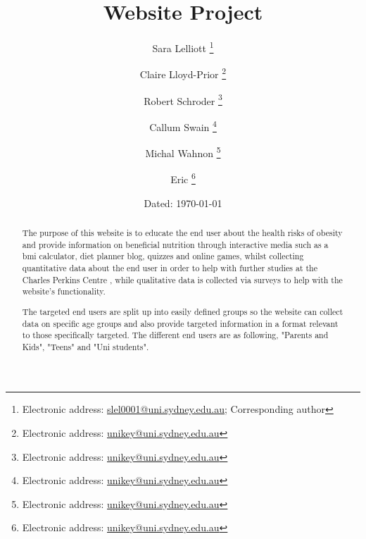 \documentclass[letterpaper,twoside,12pt]{article}
\begin{document}

\author{Sara Lelliott%
  \thanks{Electronic address: \href{mailto:slel0001@uni.sydney.edu.au}{slel0001@uni.sydney.edu.au}; Corresponding author}}
\author{Claire Lloyd-Prior%
  \thanks{Electronic address: \href{mailto:unikey@uni.sydney.edu.au}{unikey@uni.sydney.edu.au}}}
\author{Robert Schroder%
  \thanks{Electronic address: \href{mailto:unikey@uni.sydney.edu.au}{unikey@uni.sydney.edu.au}}}
\author{Callum Swain%
  \thanks{Electronic address: \href{mailto:unikey@uni.sydney.edu.au}{unikey@uni.sydney.edu.au}}}
\author{Michal Wahnon%
  \thanks{Electronic address: \href{mailto:unikey@uni.sydney.edu.au}{unikey@uni.sydney.edu.au}}}
\author{Eric%
  \thanks{Electronic address: \href{mailto:unikey@uni.sydney.edu.au}{unikey@uni.sydney.edu.au}}}
\title{Website Project}
\date{Dated: \today}

\maketitle
\begin{abstract}
  The purpose of this website is to educate the end user about the health risks of obesity and provide information on beneficial nutrition through interactive media such as a \acrfull{bmi} calculator, diet planner blog, quizzes and online games, whilst collecting quantitative data about the end user in order to help with further studies at the Charles Perkins Centre , while qualitative data is collected via surveys to help with the website's functionality.

The targeted end users are split up into easily defined groups so the website can collect data on specific age groups and also provide targeted information in a format relevant to those specifically targeted. The different end users are as following, "Parents and Kids", "Teens" and "Uni students".
\end{abstract}
\newpage
\listoffigures
\newpage
\tableofcontents
\end{document}
